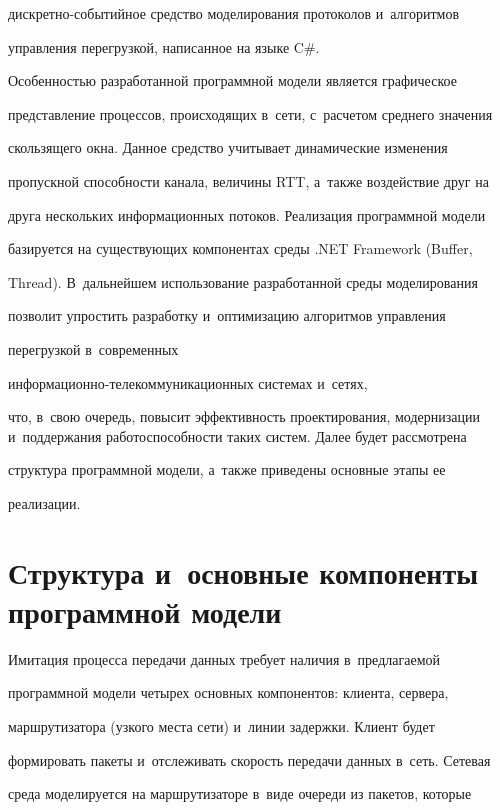 дискретно-событийное средство моделирования протоколов и~алгоритмов


управления перегрузкой, написанное на языке C\#.





  Особенностью разработанной программной модели является графическое


представление процессов, происходящих в~сети, с~расчетом среднего значения


скользящего окна. Данное средство учитывает динамические изменения


пропускной способности канала, величины RTT, а~также воздействие друг на


друга нескольких информационных потоков. Реализация программной модели


базируется на существующих компонентах среды .NET Framework (Buffer,


Thread). В~дальнейшем использование разработанной среды моделирования


поз\-во\-лит упростить разработку и~оптимизацию алгоритмов управления


перегрузкой в~современных


  ин\-фор\-ма\-ци\-он\-но-те\-ле\-ком\-му\-ни\-ка\-ци\-он\-ных системах и~сетях,


что, в~свою очередь, повысит эффективность проектирования, модернизации и~поддержания работоспособности таких систем. Далее будет рассмотрена


структура программной модели, а~также приведены основные этапы ее


реализации.





\section{Структура и~основные компоненты программной модели}





  Имитация процесса передачи данных требует наличия в~предлагаемой


программной модели четырех основных компонентов: клиента, сервера,


маршрутизатора (узкого места сети) и~линии задержки. Клиент будет


формировать пакеты и~отслеживать скорость передачи данных в~сеть. Сетевая


среда моделируется на маршрутизаторе в~виде очереди из пакетов, которые


